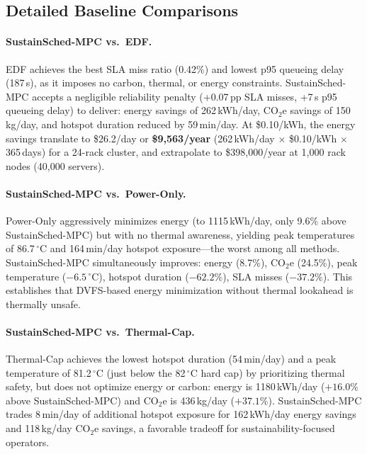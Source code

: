 \documentclass[a4paper,fleqn]{cas-dc}
\begin{document}
\subsection{Detailed Baseline Comparisons}
\label{sec:baseline_comparison}

\paragraph{SustainSched-MPC vs.\ EDF.}
EDF achieves the best SLA miss ratio (0.42\%) and lowest p95 queueing delay (187\,s), as it imposes no carbon, thermal, or energy constraints. SustainSched-MPC accepts a negligible reliability penalty (+0.07\,pp SLA misses, +7\,s p95 queueing delay) to deliver: energy savings of 262\,kWh/day, CO$_2$e savings of 150\,kg/day, and hotspot duration reduced by 59\,min/day. At \$0.10/kWh, the energy savings translate to \$26.2/day or \textbf{\$9,563/year} (262\,kWh/day $\times$ \$0.10/kWh $\times$ 365\,days) for a 24-rack cluster, and extrapolate to \$398,000/year at 1,000 rack nodes (40,000 servers).

\paragraph{SustainSched-MPC vs.\ Power-Only.}
Power-Only aggressively minimizes energy (to 1115\,kWh/day, only 9.6\% above SustainSched-MPC) but with no thermal awareness, yielding peak temperatures of 86.7$\,^\circ$C and 164\,min/day hotspot exposure---the worst among all methods. SustainSched-MPC simultaneously improves: energy (8.7\%), CO$_2$e (24.5\%), peak temperature ($-6.5\,^\circ$C), hotspot duration ($-62.2\%$), SLA misses ($-37.2\%$). This establishes that DVFS-based energy minimization without thermal lookahead is thermally unsafe.

\paragraph{SustainSched-MPC vs.\ Thermal-Cap.}
Thermal-Cap achieves the lowest hotspot duration (54\,min/day) and a peak temperature of 81.2$\,^\circ$C (just below the 82$\,^\circ$C hard cap) by prioritizing thermal safety, but does not optimize energy or carbon: energy is 1180\,kWh/day ($+16.0\%$ above SustainSched-MPC) and CO$_2$e is 436\,kg/day ($+37.1\%$). SustainSched-MPC trades 8\,min/day of additional hotspot exposure for 162\,kWh/day energy savings and 118\,kg/day CO$_2$e savings, a favorable tradeoff for sustainability-focused operators.
\end{document}
